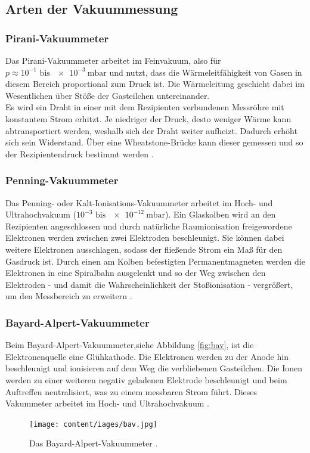 \subsection{Arten der Vakuummessung}

\subsubsection{Pirani-Vakuummeter}

Das Pirani-Vakuummeter arbeitet im Feinvakuum, also für $p\approx 10^{-1}\text{ bis }\SI{e-3}{\milli\bar}$ und nutzt, dass die Wärmeleitfähigkeit von Gasen in diesem Bereich proportional zum Druck ist. Die Wärmeleitung geschieht dabei im Wesentlichen über Stöße der Gasteilchen untereinander.\\
Es wird ein Draht in einer mit dem Rezipienten verbundenen Messröhre mit konstantem Strom erhitzt. Je niedriger der Druck, desto weniger Wärme kann abtransportiert werden, weshalb sich der Draht weiter aufheizt. Dadurch erhöht sich sein Widerstand. Über eine Wheatstone-Brücke kann dieser gemessen und so der Rezipientendruck bestimmt werden \cite{Jena}.

\subsubsection{Penning-Vakuummeter}

Das Penning- oder Kalt-Ionisations-Vakuummeter arbeitet im Hoch- und Ultrahochvakuum ($10^{-3} \text{ bis } \SI{e-12}{\milli\bar}$). Ein Glaskolben wird an den Rezipienten angeschlossen und durch natürliche Raumionisation freigewordene Elektronen werden zwischen zwei Elektroden beschleunigt. Sie können dabei weitere Elektronen ausschlagen, sodass der fließende Strom ein Maß für den Gasdruck ist. Durch einen am Kolben befestigten Permanentmagneten werden die Elektronen in eine Spiralbahn ausgelenkt und so der Weg zwischen den Elektroden - und damit die Wahrscheinlichkeit der Stoßionisation - vergrößert, um den Messbereich zu erweitern \cite{Jena}.

\subsubsection{Bayard-Alpert-Vakuummeter}

Beim Bayard-Alpert-Vakuummeter,siehe Abbildung \ref{fig:bav}, ist die Elektronenquelle eine Glühkathode. Die Elektronen werden zu der Anode hin beschleunigt und ionisieren auf dem Weg die verbliebenen Gasteilchen. Die Ionen werden zu einer weiteren negativ geladenen Elektrode beschleunigt und beim Auftreffen neutralisiert, was zu einem messbaren Strom führt. Dieses Vakummeter arbeitet im Hoch- und Ultrahochvakuum \cite{Spektrum}.
\begin{figure}
\centering
\texttt{[image: content/iages/bav.jpg]}
\caption{Das Bayard-Alpert-Vakuummeter \cite{Spektrum}.}
\end{figure}